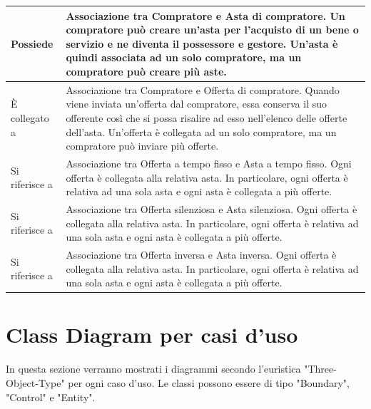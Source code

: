 \begin{longtable}{|C{3.5cm}|L{11.2cm}|}
            \hline
                Possiede &
                Associazione tra Compratore e Asta di compratore. Un compratore può creare un'asta per l'acquisto di un bene o servizio e ne diventa il possessore e gestore. Un'asta è quindi associata ad un solo compratore, ma un compratore può creare più aste.\\
            \hline
                È collegato a &
                Associazione tra Compratore e Offerta di compratore. Quando viene inviata un'offerta dal compratore, essa conserva il suo offerente così che si possa risalire ad esso nell'elenco delle offerte dell'asta. Un'offerta è collegata ad un solo compratore, ma un compratore può inviare più offerte.\\
            \hline
                Si riferisce a &
                Associazione tra Offerta a tempo fisso e Asta a tempo fisso. Ogni offerta è collegata alla relativa asta. In particolare, ogni offerta è relativa ad una sola asta e ogni asta è collegata a più offerte.\\
            \hline
                Si riferisce a &
                Associazione tra Offerta silenziosa e Asta silenziosa. Ogni offerta è collegata alla relativa asta. In particolare, ogni offerta è relativa ad una sola asta e ogni asta è collegata a più offerte.\\
            \hline
                Si riferisce a &
                Associazione tra Offerta inversa e Asta inversa. Ogni offerta è collegata alla relativa asta. In particolare, ogni offerta è relativa ad una sola asta e ogni asta è collegata a più offerte.\\
            \hline
        \end{longtable}

    \clearpage
            
    \section{Class Diagram per casi d'uso}
        In questa sezione verranno mostrati i diagrammi secondo l'euristica "Three-Object-Type" per ogni caso d'uso. Le classi possono essere di tipo "Boundary", "Control" e "Entity".
    
